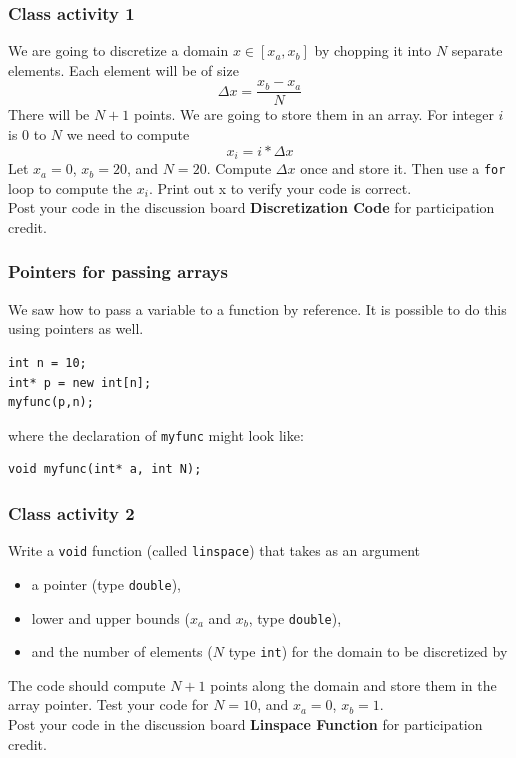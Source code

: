 \documentclass{if-beamer}
\begin{document}
\begin{frame}[fragile]
\frametitle{Class activity 1}
We are going to discretize a domain $x \in [x_a,x_b]$ by chopping it into $N$
separate elements. Each element will be of size
\begin{equation*}
\Delta x = \frac{x_b - x_a}{N}
\end{equation*}
There will be $N+1$ points. We are going to store them in an array. For
integer $i$ is 0 to $N$ we need to compute
\begin{equation*}
x_{i} = i * \Delta x
\end{equation*}
Let $x_a = 0$, $x_b = 20$, and $N = 20$. Compute $\Delta x$ once and store it. Then use a \texttt{for} loop to compute the $x_{i}$. Print out x to verify your code is correct.\\

\vspace{10pt}
Post your code in the discussion board \textbf{Discretization Code} for participation credit.
\end{frame}

\begin{frame}[fragile]
\frametitle{Pointers for passing arrays}
We saw how to pass a variable to a function by reference. It is possible to
do this using pointers as well.
\begin{lstlisting}
int n = 10;
int* p = new int[n];
myfunc(p,n);
\end{lstlisting}
where the declaration of \texttt{myfunc} might look like:
\begin{lstlisting}
void myfunc(int* a, int N);
\end{lstlisting}
\end{frame}

\begin{frame}[fragile]
\frametitle{Class activity 2}
Write a \texttt{void} function (called \texttt{linspace}) that takes as an
argument \\
\vspace{5pt}
\begin{itemize}
	\item a pointer (type \texttt{double}),\\
	\item lower and upper bounds ($x_a$ and $x_b$, type \texttt{double}), \\
	\item and the number of elements ($N$ type \texttt{int}) for the domain
	to be discretized by	\\
\end{itemize}
\vspace{5pt}
The code should compute $N+1$ points along the domain and store them in the array pointer. Test your code for $N = 10$, and $x_a = 0$, $x_b = 1$.\\

\vspace{10pt}
Post your code in the discussion board \textbf{Linspace Function} for participation credit.
\end{frame}
\end{document}
